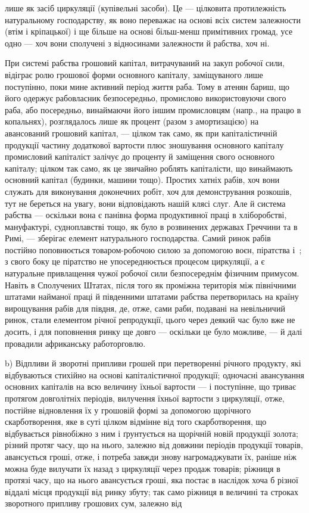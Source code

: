 \parcont{}  %
лише як засіб циркуляції (купівельні засоби). Це — цілковита протилежність
натуральному господарству, як воно переважає на основі всіх систем
залежности (втім і кріпацької) і ще більше на основі більш-менш примітивних
громад, усе одно — хоч вони сполучені з відносинами залежности
й рабства, хоч ні.

При системі рабства грошовий капітал, витрачуваний на закуп робочої
сили, відіграє ролю грошової форми основного капіталу, заміщуваного
лише поступінно, поки мине активний період життя раба. Тому
в атенян бариш, що його одержує рабовласник безпосередньо, промислово
використовуючи свого раба, або посередньо, винаймаючи його іншим
промисловцям (напр., на працю в копальнях), розглядалось лише як
процент (разом з амортизацією) на авансований грошовий капітал, —
цілком так само, як при капіталістичній продукції частину додаткової
вартости плюс зношування основного капіталу промисловий капіталіст залічує
до проценту й заміщення свого основного капіталу; цілком так само, як
це звичайно роблять капіталісти, що винаймають основний капітал (будинки,
машини тощо). Простих хатніх рабів, хоч вони служать для виконування
доконечних робіт, хоч для демонстрування розкошів, тут не береться на
увагу, вони відповідають нашій клясі слуг. Але й система рабства —
оскільки вона є панівна форма продуктивної праці в хліборобстві, мануфактурі,
судноплавстві тощо, як було в розвинених державах Греччини та
в Римі, — зберігає елемент натурального господарства. Самий ринок
рабів постійно поповнюється товаром-робочою силою за допомогою воєн,
піратства і~; з свого боку це піратство не упосереднюється процесом
циркуляції, а є натуральне привлащення чужої робочої сили
безпосереднім фізичним примусом. Навіть в Сполучених Штатах, після
того як проміжна територія між північними штатами найманої праці й
південними штатами рабства перетворилась на країну вирощування рабів
для півдня, де, отже, сами раби, подавані на невільничий ринок, стали
елементом річної репродукції, цього через деякий час було вже не досить,
і для поповнення ринку ще довго — оскільки це було можливе, — й
далі провадили африканську работорговлю.

b) Відпливи й зворотні припливи грошей при перетворенні річного
продукту, які відбуваються стихійно на основі капіталістичної продукції;
одночасні авансування основних капіталів на всю величину їхньої вартости
— і поступінне, що триває протягом довголітніх періодів, вилучення
їхньої вартости з циркуляції, отже, постійне відновлення їх у грошовій
формі за допомогою щорічного скарботворення, яке в суті цілком
відмінне від того скарботворення, що відбувається рівнобіжно з ним і
ґрунтується на щорічній новій продукції золота; різний протяг часу, що
на нього, залежно від довжини періодів продукції товарів, авансується
гроші, отже, і потреба завжди знову нагромаджувати їх, раніше ніж
можна буде вилучати їх назад з циркуляції через продаж товарів; ріжниця
в протязі часу, що на нього авансується гроші, яка постає в наслідок
хоча б різної віддалі місця продукції від ринку збуту; так само ріжниця
в величині та строках зворотного припливу грошових сум, залежно від
\parbreak{}  %
